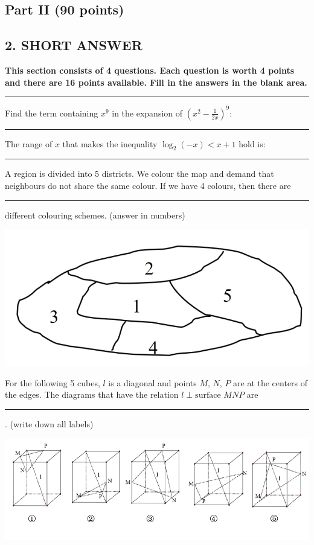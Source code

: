 \documentclass[letterpaper,10pt,addpoints]{exam}
\begin{document}
\begin{center}
\section*{Part II (90 points)}
\end{center}
\subsection*{2. SHORT ANSWER}
\large{\textbf{This section consists of 4 questions. Each question is worth 4 points and there are 16 points available. Fill in the answers in the blank area.}\\}
\noindent \rule{\textwidth}{1pt}

\begin{questions}
\setcounter{question}{\mycounter1}

\question
Find the term containing $x^9$ in the expansion of $\left(x^{2}-\frac{1}{2 x}\right)^{9}$: \rule{80pt}{0.5pt}

\question
The range of $x$ that makes the inequality $\log _{2}(-x)<x+1$ hold is: \rule{80pt}{0.5pt}

\question
A region is divided into 5 districts. We colour the map and demand that neighbours do not share the same colour. If we have 4 colours, then there are \rule{80pt}{0.5pt} different colouring schemes. (answer in numbers)
\begin{center}
     \includegraphics[scale=0.35]{q15.png}
\end{center}

\question
For the following 5 cubes, $l$ is a diagonal and points $M$, $N$, $P$ are at the centers of the edges. The diagrams that have the relation $l\perp \textrm{surface }MNP$ are \rule{80pt}{0.5pt}. (write down all labels)
\begin{center}
    \includegraphics[scale=0.65]{q16.png}
    \end{center}

\xdef\mycounter2{}
\end{questions}
\clearpage
\end{document}
